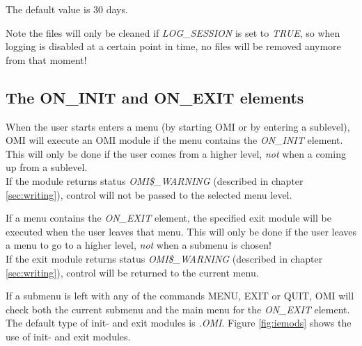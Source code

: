 \documentclass[a4paper]{book}
\newcommand{\vs}{\vspace{3mm}}
\begin{document}
The default value is 30 days.

\vs

Note the files will only be cleaned if \textsl{LOG{\_}SESSION} is set to \textsl{TRUE}, so when logging is disabled at a certain point in time, no files will be removed anymore from that moment!

\subsection{The ON{\_}INIT and ON{\_}EXIT elements}
\label{subsubsec:mylabel22}

When the user starts enters a menu (by starting OMI or by entering a 
sublevel), OMI will execute an OMI module if the menu contains the 
\textsl{ON{\_}INIT} element. This will only be done 
if the user comes from a higher level, \textit{not} when a coming up from a sublevel. \\
If the module returns status \textsl{OMI{\$}{\_}WARNING} (described in chapter \ref{sec:writing}), 
control will not be passed to the selected menu level.

\vs

If a menu contains the \textsl{ON{\_}EXIT} element, the 
specified exit module will be executed when the user leaves that menu. This 
will only be done if the user leaves a menu to go to a higher level, \textit{not} when a 
submenu is chosen! \\
If the exit module returns status \textsl{OMI{\$}{\_}WARNING} (described in chapter 
\ref{sec:writing}), control will be returned to the current menu.

\vs

If a submenu is left with any of the commands \textsf{MENU}, \textsf{EXIT} or \textsf{QUIT}, OMI will 
check both the current submenu and the main menu for the \textsl{ON{\_}EXIT} element. \\
The default type of init- and exit modules is \textsl{.OMI}. Figure \ref{fig:iemods}
shows the use of init- and exit modules.
\end{document}
